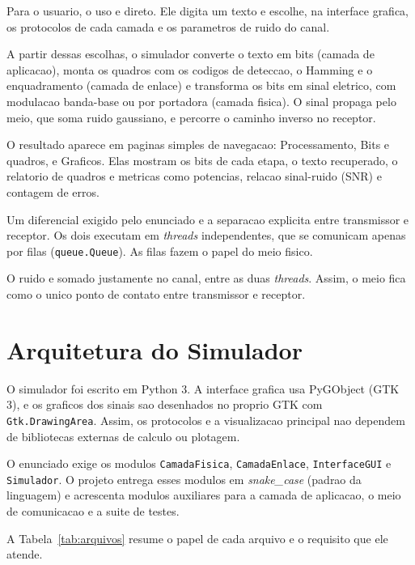 \documentclass[12pt,a4paper]{article}
\begin{document}
Para o usuario, o uso e direto. Ele digita um texto e escolhe, na interface grafica, os protocolos de cada camada e os parametros de ruido do canal.

A partir dessas escolhas, o simulador converte o texto em bits (camada de aplicacao), monta os quadros com os codigos de deteccao, o Hamming e o enquadramento (camada de enlace) e transforma os bits em sinal eletrico, com modulacao banda-base ou por portadora (camada fisica). O sinal propaga pelo meio, que soma ruido gaussiano, e percorre o caminho inverso no receptor.

O resultado aparece em paginas simples de navegacao: Processamento, Bits e quadros, e Graficos. Elas mostram os bits de cada etapa, o texto recuperado, o relatorio de quadros e metricas como potencias, relacao sinal-ruido (SNR) e contagem de erros.

Um diferencial exigido pelo enunciado e a separacao explicita entre transmissor e receptor. Os dois executam em \textit{threads} independentes, que se comunicam apenas por filas (\texttt{queue.Queue}). As filas fazem o papel do meio fisico.

O ruido e somado justamente no canal, entre as duas \textit{threads}. Assim, o meio fica como o unico ponto de contato entre transmissor e receptor.

\section{Arquitetura do Simulador}

O simulador foi escrito em Python 3. A interface grafica usa PyGObject (GTK 3), e os graficos dos sinais sao desenhados no proprio GTK com \texttt{Gtk.DrawingArea}. Assim, os protocolos e a visualizacao principal nao dependem de bibliotecas externas de calculo ou plotagem.

O enunciado exige os modulos \texttt{CamadaFisica}, \texttt{CamadaEnlace}, \texttt{InterfaceGUI} e \texttt{Simulador}. O projeto entrega esses modulos em \textit{snake\_case} (padrao da linguagem) e acrescenta modulos auxiliares para a camada de aplicacao, o meio de comunicacao e a suite de testes.

A Tabela~\ref{tab:arquivos} resume o papel de cada arquivo e o requisito que ele atende.
\end{document}
